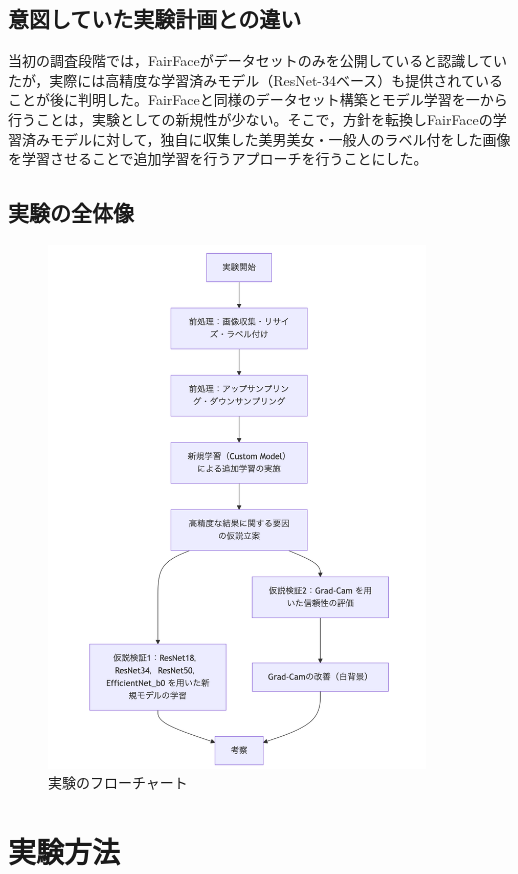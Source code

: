 \documentclass[a4paper,11pt,titlepage]{jsarticle}
\begin{document}
\subsection{意図していた実験計画との違い}
\label{label:意図していた実験計画との違い}
当初の調査段階では，FairFaceがデータセットのみを公開していると認識していたが，実際には高精度な学習済みモデル（ResNet-34ベース）も提供されていることが後に判明した。FairFaceと同様のデータセット構築とモデル学習を一から行うことは，実験としての新規性が少ない。そこで，方針を転換しFairFaceの学習済みモデルに対して，独自に収集した美男美女・一般人のラベル付をした画像を学習させることで追加学習を行うアプローチを行うことにした。

\subsection{実験の全体像}
\begin{figure}[H]
    \centering
    \includegraphics[width=100mm]{overall.png}
    \caption{実験のフローチャート}
    \label{fig:csv}
\end{figure}

\section{実験方法}
\label{label:実験方法}
\end{document}
